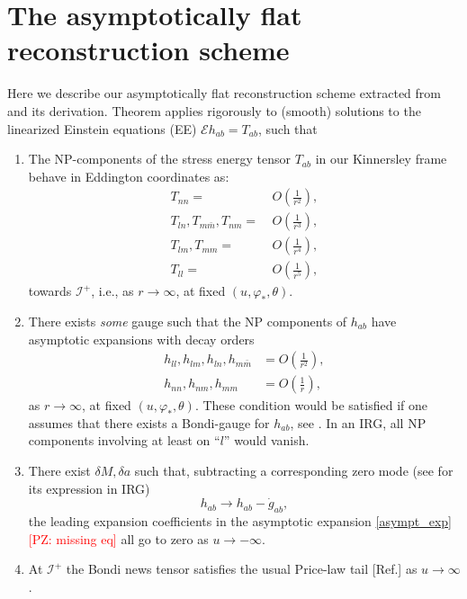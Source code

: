 \documentclass[%
reprint,
 prd,
superscriptaddress,
nofootinbib,
aps,
dvipsnames
]{revtex4-2}
\newcommand{\PZ}[1]{\textcolor{red}{\textsf{[PZ: #1]}}}
\newcommand{\E}{{\mathcal E}}
\newcommand{\sI}{{\mathscr I}}
\begin{document}
\section{The asymptotically flat reconstruction scheme}
\label{sec:scheme}

Here we describe our asymptotically flat reconstruction scheme extracted from \cite[Thm. 4]{Hollands:2024iqp} and its derivation. Theorem \cite[Thm. 4]{Hollands:2024iqp} applies rigorously to (smooth) solutions to the linearized Einstein equations (EE) $\E h_{ab} = T_{ab}$, such that
\begin{enumerate}
    \item The NP-components of the stress energy tensor $T_{ab}$ in our Kinnersley frame behave in Eddington coordinates as:
\begin{equation}\label{Tdec}
\begin{split}
T_{nn} =&  \ O\left(\frac{1}{r^2}\right) , \\
T_{ln}, T_{m\bar m}, T_{nm} =& \ O\left(\frac{1}{r^3}\right), \\
T_{lm}, T_{mm} =& \ O\left(\frac{1}{r^4}\right), \\
T_{ll} =& \ O\left(\frac{1}{r^5}\right),
\end{split}
\end{equation}
%
towards ${\mathscr I}^+$, i.e.,
as $r \to \infty$, at fixed $(u,\varphi_*,\theta)$.

\item There exists {\it some} gauge such that
the NP components of $h_{ab}$ have asymptotic expansions 
with decay orders 
\begin{equation}
\label{eq:hdec}
\begin{split}
    h_{ll}, h_{lm}, h_{ln}, h_{m\bar{m}} &= O\left(\frac{1}{r^2}\right), \\
h_{nn}, h_{nm}, h_{mm} &= O\left(\frac{1}{r}\right),
\end{split}
\end{equation}
as $r \to \infty$, at fixed $(u,\varphi_*,\theta)$.
These condition would be satisfied if one assumes that there exists a Bondi-gauge for $h_{ab}$, see \cite[App. D]{Hollands:2024iqp}. In an IRG, all NP components involving at least on ``$l$'' would vanish.
\item There exist $\delta M, \delta a$ such that, subtracting a corresponding zero mode (see \cite[App. C]{Hollands:2024iqp} for its expression in IRG)
\begin{equation}
\label{zerosubtract}
    h_{ab} \to h_{ab} - \dot g_{ab},
\end{equation}
the leading expansion coefficients in the asymptotic expansion \eqref{asympt_exp}\PZ{missing eq}  all go to zero as $u \to -\infty$.
\item At ${\mathscr I}^+$ the Bondi news tensor satisfies the usual Price-law tail [Ref.] as $u \to \infty$.
\end{enumerate}
\end{document}
